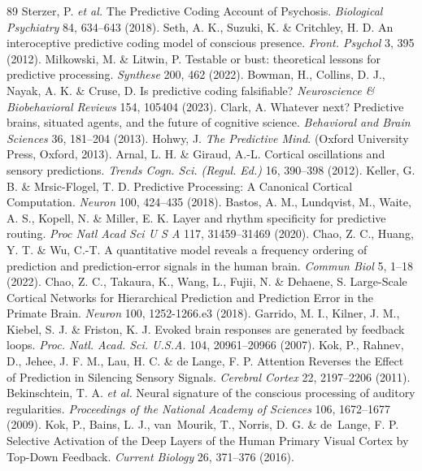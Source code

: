 \documentclass[12pt]{article}
\begin{document}
\begin{thebibliography}{89}
 Sterzer, P. \emph{et al.} The Predictive Coding Account of Psychosis. \emph{Biological Psychiatry} 84, 634--643 (2018).
 Seth, A. K., Suzuki, K. \& Critchley, H. D. An interoceptive predictive coding model of conscious presence. \emph{Front. Psychol} 3, 395 (2012).
 Miłkowski, M. \& Litwin, P. Testable or bust: theoretical lessons for predictive processing. \emph{Synthese} 200, 462 (2022).
 Bowman, H., Collins, D. J., Nayak, A. K. \& Cruse, D. Is predictive coding falsifiable? \emph{Neuroscience \& Biobehavioral Reviews} 154, 105404 (2023).
 Clark, A. Whatever next? Predictive brains, situated agents, and the future of cognitive science. \emph{Behavioral and Brain Sciences} 36, 181--204 (2013).
 Hohwy, J. \emph{The Predictive Mind}. (Oxford University Press, Oxford, 2013).
 Arnal, L. H. \& Giraud, A.-L. Cortical oscillations and sensory predictions. \emph{Trends Cogn. Sci. (Regul. Ed.)} 16, 390--398 (2012).
 Keller, G. B. \& Mrsic-Flogel, T. D. Predictive Processing: A Canonical Cortical Computation. \emph{Neuron} 100, 424--435 (2018).
 Bastos, A. M., Lundqvist, M., Waite, A. S., Kopell, N. \& Miller, E. K. Layer and rhythm specificity for predictive routing. \emph{Proc Natl Acad Sci U S A} 117, 31459--31469 (2020).
 Chao, Z. C., Huang, Y. T. \& Wu, C.-T. A quantitative model reveals a frequency ordering of prediction and prediction-error signals in the human brain. \emph{Commun Biol} 5, 1--18 (2022).
 Chao, Z. C., Takaura, K., Wang, L., Fujii, N. \& Dehaene, S. Large-Scale Cortical Networks for Hierarchical Prediction and Prediction Error in the Primate Brain. \emph{Neuron} 100, 1252-1266.e3 (2018).
 Garrido, M. I., Kilner, J. M., Kiebel, S. J. \& Friston, K. J. Evoked brain responses are generated by feedback loops. \emph{Proc. Natl. Acad. Sci. U.S.A.} 104, 20961--20966 (2007).
 Kok, P., Rahnev, D., Jehee, J. F. M., Lau, H. C. \& de Lange, F. P. Attention Reverses the Effect of Prediction in Silencing Sensory Signals. \emph{Cerebral Cortex} 22, 2197--2206 (2011).
 Bekinschtein, T. A. \emph{et al.} Neural signature of the conscious processing of auditory regularities. \emph{Proceedings of the National Academy of Sciences} 106, 1672--1677 (2009).
 Kok, P., Bains, L. J., van~Mourik, T., Norris, D. G. \& de~Lange, F. P. Selective Activation of the Deep Layers of the Human Primary Visual Cortex by Top-Down Feedback. \emph{Current Biology} 26, 371--376 (2016).

\end{thebibliography}
\end{document}
